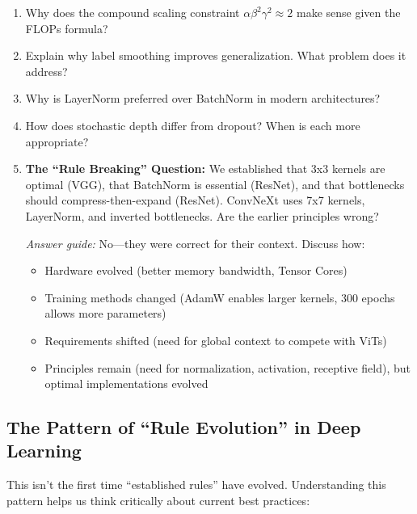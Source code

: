 \documentclass{article}
\begin{document}
\begin{enumerate}
    \item Why does the compound scaling constraint $\alpha \beta^2 \gamma^2 \approx 2$ make sense given the FLOPs formula?
    
    \item Explain why label smoothing improves generalization. What problem does it address?
    
    \item Why is LayerNorm preferred over BatchNorm in modern architectures?
    
    \item How does stochastic depth differ from dropout? When is each more appropriate?
    
    \item \textbf{The ``Rule Breaking'' Question:} We established that 3x3 kernels are optimal (VGG), that BatchNorm is essential (ResNet), and that bottlenecks should compress-then-expand (ResNet). ConvNeXt uses 7x7 kernels, LayerNorm, and inverted bottlenecks. Are the earlier principles wrong?
    
    \textit{Answer guide:} No---they were correct for their context. Discuss how:
    \begin{itemize}
        \item Hardware evolved (better memory bandwidth, Tensor Cores)
        \item Training methods changed (AdamW enables larger kernels, 300 epochs allows more parameters)
        \item Requirements shifted (need for global context to compete with ViTs)
        \item Principles remain (need for normalization, activation, receptive field), but optimal implementations evolved
    \end{itemize}
\end{enumerate}

\subsection{The Pattern of ``Rule Evolution'' in Deep Learning}

This isn't the first time ``established rules'' have evolved. Understanding this pattern helps us think critically about current best practices:
\end{document}
